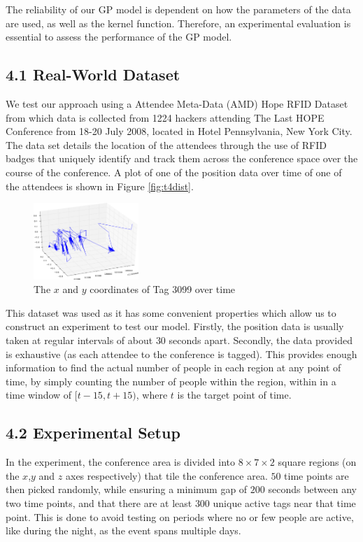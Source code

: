 \documentclass[letterpaper]{article}
\begin{document}
The reliability of our GP model is dependent on how the parameters of the data are used, as well as the kernel function. Therefore, an experimental evaluation is essential to assess the performance of the GP model.

\subsection{4.1  Real-World Dataset}

We test our approach using a Attendee Meta-Data (AMD) Hope RFID Dataset from which data is collected from 1224 hackers attending The Last HOPE Conference from 18-20 July 2008, located in Hotel Pennsylvania, New York City. The data set details the location of the attendees through the use of RFID badges that uniquely identify and track them across the conference space over the course of the conference. A plot of one of the position data over time of one of the attendees is shown in Figure \ref{fig:t4dist}.\\

\begin{figure}[h!]
  \centering
    \includegraphics[width=150px,natwidth=675,natheight=493]{positiondata.png}
  \caption{The $x$ and $y$ coordinates of Tag 3099 over time}
  \label{fig:spaths}
\end{figure}

This dataset was used as it has some convenient properties which allow us to construct an experiment to test our model. Firstly, the position data is usually taken at regular intervals of about $30$ seconds apart. Secondly, the data provided is exhaustive (as each attendee to the conference is tagged). This provides enough information to find the actual number of people in each region at any point of time, by simply counting the number of people within the region, within in a time window of $[t-15,t+15)$, where $t$ is the target point of time. 

\subsection{4.2  Experimental Setup}

In the experiment, the conference area is divided into $8\times 7 \times 2$ square regions (on the $x$,$y$ and $z$ axes respectively) that tile the conference area. $50$ time points are then picked randomly, while ensuring a minimum gap of $200$ seconds between any two time points, and that there are at least $300$ unique active tags near that time point. This is done to avoid testing on periods where no or few people are active, like during the night, as the event spans multiple days.\\
\end{document}
